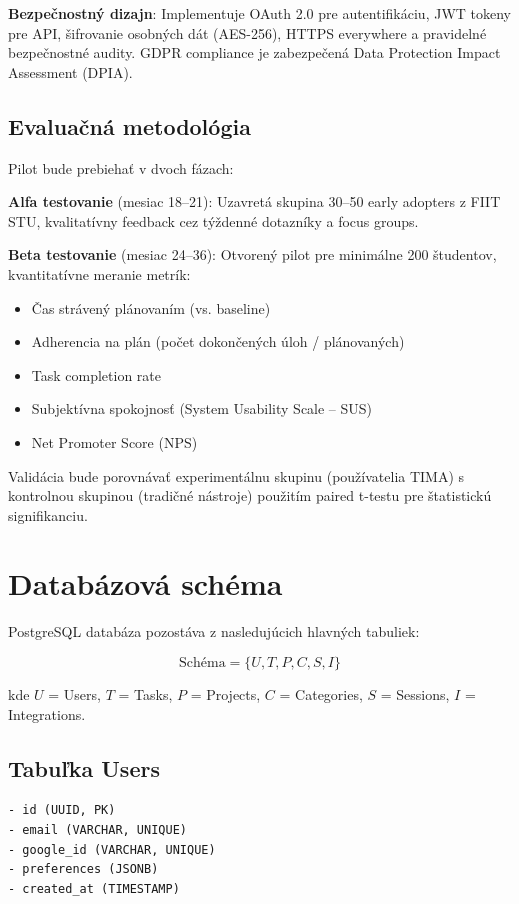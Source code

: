\documentclass[10pt,twocolumn,twoside,slovak,a4paper]{article}
\begin{document}
\textbf{Bezpečnostný dizajn}: Implementuje OAuth 2.0 pre autentifikáciu, JWT tokeny pre API, šifrovanie osobných dát (AES-256), HTTPS everywhere a pravidelné bezpečnostné audity. GDPR compliance je zabezpečená Data Protection Impact Assessment (DPIA).

\subsection{Evaluačná metodológia}

Pilot bude prebiehať v dvoch fázach:

\textbf{Alfa testovanie} (mesiac 18--21): Uzavretá skupina 30--50 early adopters z FIIT STU, kvalitatívny feedback cez týždenné dotazníky a focus groups.

\textbf{Beta testovanie} (mesiac 24--36): Otvorený pilot pre minimálne 200 študentov, kvantitatívne meranie metrík:
\begin{itemize}
\item Čas strávený plánovaním (vs. baseline)
\item Adherencia na plán (počet dokončených úloh / plánovaných)
\item Task completion rate
\item Subjektívna spokojnosť (System Usability Scale -- SUS)
\item Net Promoter Score (NPS)
\end{itemize}

Validácia bude porovnávať experimentálnu skupinu (používatelia TIMA) s kontrolnou skupinou (tradičné nástroje) použitím paired t-testu pre štatistickú signifikanciu.

\section{Databázová schéma}

PostgreSQL databáza pozostáva z nasledujúcich hlavných tabuliek:

\[
\text{Schéma} = \{ U, T, P, C, S, I \}
\]

kde $U$ = Users, $T$ = Tasks, $P$ = Projects, $C$ = Categories, $S$ = Sessions, $I$ = Integrations.

\subsection{Tabuľka Users}
\begin{verbatim}
- id (UUID, PK)
- email (VARCHAR, UNIQUE)
- google_id (VARCHAR, UNIQUE)
- preferences (JSONB)
- created_at (TIMESTAMP)
\end{verbatim}
\end{document}
